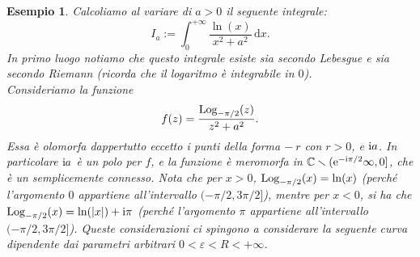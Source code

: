 \documentclass[11pt]{book}
\theoremstyle{Definizione}
\theoremstyle{TeoremaProposizioneLemmaCorollarioCongettura}
\theoremstyle{OsservazioneNotaEsempio}
\newtheorem{myes}{Esempio}[section]
\newcommand{\R}{\mathbb{R}}
\newcommand{\C}{\mathbb{C}}
\newcommand{\tolto}{\smallsetminus}
\renewcommand{\i}{\textup{i}}
\newcommand{\e}{\textup{e}}
\renewcommand{\d}{\mathrm{d}}
\newcommand{\dx}{\,\d x}
\newcommand{\Log}[1][]{\textup{Log}_{#1}}
\newcommand{\frecciaIn}{
\tikz \draw[-latex] (-1pt,0) -- (1pt,0);
}
\newcommand{\frecciaOut}{
\tikz \draw[latex-] (-1pt,0) -- (1pt,0);
}
\begin{document}
\begin{myes}\label{es:EsempioIntegraleLogaritmo}
Calcoliamo al variare di $a > 0$ il seguente integrale:
$$
I_a := \int_0^{+\infty} \frac{\ln(x)}{x^2+a^2}\dx.
$$
In primo luogo notiamo che questo integrale esiste sia secondo Lebesgue e sia secondo Riemann (ricorda che il logaritmo è integrabile in $0$).\\
Consideriamo la funzione 
$$
f(z) = \frac{\Log[-\pi/2](z)}{z^2+a^2}.
$$
Essa è olomorfa dappertutto eccetto i punti della forma $-\ r$ con $r > 0$, e $\i a$. In particolare $\i a$ è un polo per $f$, e la funzione è meromorfa in $\C \tolto (\e^{-\i\pi/2}\infty,0]$, che è un semplicemente connesso. Nota che per $x > 0$, $\Log[-\pi/2](x) = \ln(x)$ (perché l'argomento $0$ appartiene all'intervallo $(-\pi/2,3\pi/2]$), mentre per $x < 0$, si ha che $\Log[-\pi/2](x) = \ln(|x|)+\i\pi$ (perché l'argomento $\pi$ appartiene all'intervallo $(-\pi/2,3\pi/2]$). Queste considerazioni ci spingono a considerare la seguente curva dipendente dai parametri arbitrari $0<\varepsilon<R<+\infty$.
\begin{center}

\end{center}
\end{myes}
\end{document}
